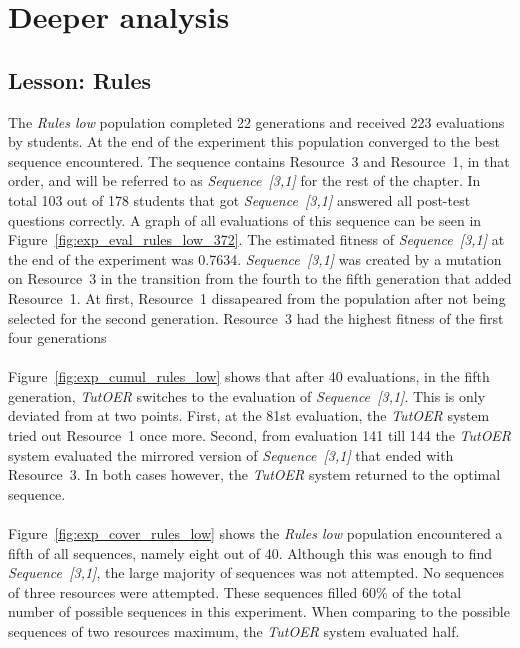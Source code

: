 \section{Deeper analysis}
\label{sec:results_analysis}
\subsection{Lesson: Rules}
\label{sec:results_rules}
The \emph{Rules low} population completed 22 generations and received 
223 evaluations by students. At the end of the experiment
this population converged to the best sequence encountered. The
sequence contains Resource~3 and Resource~1, in that order, and will be
referred to as \emph{Sequence~[3,1]} for the rest of the chapter. In total 103
out of 178 students that got \emph{Sequence~[3,1]} answered all post-test
questions correctly. A graph of all evaluations of this sequence can be seen in
Figure~\ref{fig:exp_eval_rules_low_372}.
The estimated fitness of \emph{Sequence~[3,1]} at the end of the experiment was
0.7634. \emph{Sequence~[3,1]} was created by a mutation on Resource~3 in the transition
from the fourth to the fifth generation that added Resource~1. At first,
Resource~1 dissapeared from the population after not being selected for the
second generation. Resource~3 had the highest fitness of the first four
generations \\\\
\noindent
Figure~\ref{fig:exp_cumul_rules_low} shows that after 40 evaluations, in the fifth generation, \emph{TutOER}
switches to the evaluation of \emph{Sequence~[3,1]}. This is only deviated from at
two points. First, at the 81st evaluation, the \emph{TutOER} system tried out
Resource~1 once more. Second, from evaluation 141 till 144 the \emph{TutOER}
system evaluated the mirrored version of \emph{Sequence~[3,1]} that ended with
Resource~3. In both cases however, the \emph{TutOER} system returned to the
optimal sequence.\\\\
\noindent
Figure~\ref{fig:exp_cover_rules_low} shows the \emph{Rules low} population
encountered a fifth of all sequences, namely eight out of 40. Although this was
enough to find \emph{Sequence~[3,1]}, the large majority of sequences was not
attempted. No sequences of three resources were attempted. These sequences
filled 60\% of the total number of possible sequences in this experiment. When
comparing to the possible sequences of two resources maximum, the \emph{TutOER}
system evaluated half.\\\\
